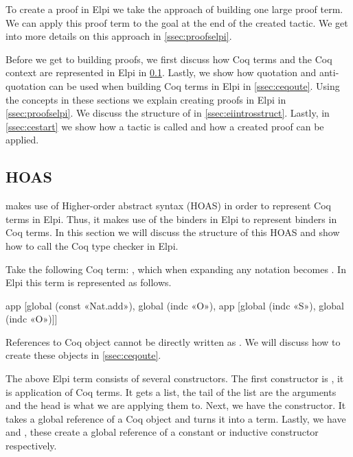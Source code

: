 \documentclass[thesis.tex]{subfiles}
\begin{document}
{{To create a proof in Elpi we take the approach of building one large proof term. We can apply this proof term to the goal at the end of the created tactic. We get into more details on this approach in \cref{ssec:proofselpi}.

Before we get to building proofs, we first discuss how Coq terms and the Coq context are represented in Elpi in \cref{ssec:cehoas}. Lastly, we show how quotation and anti-quotation can be used when building Coq terms in Elpi in \cref{ssec:ceqoute}. Using the concepts in these sections we explain creating proofs in Elpi in \cref{ssec:proofselpi}. We discuss the structure of  in \cref{ssec:eiintrosstruct}. Lastly, in \cref{ssec:cestart} we show how a tactic is called and how a created proof can be applied.


\subsection{\ce HOAS} \label{ssec:cehoas}
\ce makes use of Higher-order abstract syntax (HOAS) in order to represent Coq terms in Elpi. Thus, it makes use of the binders in Elpi to represent binders in Coq terms. In this section we will discuss the structure of this HOAS and show how to call the Coq type checker in Elpi.

Take the following Coq term: , which when expanding any notation becomes . In Elpi this term is represented as follows.
\begin{elpicode}
  app [global (const «Nat.add»), 
      global (indc «O»), 
      app [global (indc «S»), global (indc «O»)]]
\end{elpicode}
References to Coq object cannot be directly written as . We will discuss how to create these objects in \cref{ssec:ceqoute}.

The above Elpi term consists of several constructors. The first constructor is , it is application of Coq terms. It gets a list, the tail of the list are the arguments and the head is what we are applying them to. Next, we have the  constructor. It takes a global reference of a Coq object and turns it into a term. Lastly, we have  and , these create a global reference of a constant or inductive constructor respectively.

}}
\end{document}
